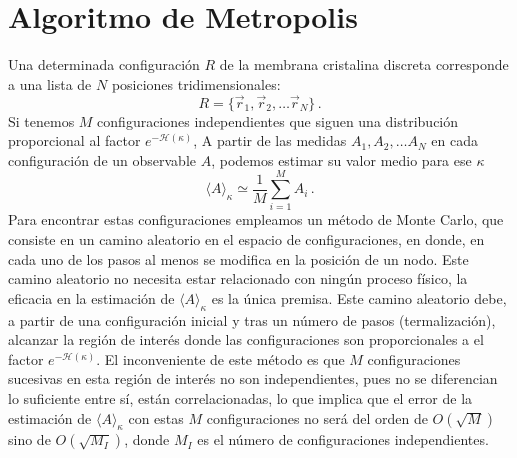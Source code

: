\section{Algoritmo de Metropolis}
Una determinada configuración $R$ de la membrana cristalina discreta 
corresponde a una lista de $N$ posiciones tridimensionales:
\begin{equation}
R=\{ \vec{r}_1,\vec{r}_2,\dots \vec{r}_N\}\,.
\end{equation}
Si tenemos $M$ configuraciones independientes que siguen una distribución
proporcional al factor $e^{-\mathcal{H}(\kappa)}$, A partir de las medidas
$A_1,A_2,\dots A_N$ en cada configuración de un observable $A$, podemos
estimar su valor medio para ese $\kappa$
\begin{equation}
\langle A \rangle_{\kappa}\simeq \frac{1}{M}\sum^M_{i=1} A_i\,.
\end{equation}
Para encontrar estas configuraciones empleamos un método de Monte Carlo, que
consiste en un camino aleatorio en el espacio de configuraciones, en donde, en
cada uno de los pasos al menos se modifica en la posición de un nodo. Este camino
aleatorio no necesita estar relacionado con ningún proceso físico, la eficacia
en la estimación de $\langle A \rangle_{\kappa}$ es la única premisa. Este
camino aleatorio debe, a partir de una configuración inicial y tras un número
de pasos (termalización), alcanzar la región de interés donde
las configuraciones son proporcionales a el factor $
e^{-\mathcal{H}(\kappa)}$. El inconveniente de este método es que $M$
configuraciones sucesivas en esta región de interés no son independientes, pues no se
diferencian lo suficiente entre sí, están correlacionadas, lo que implica que el
error de la estimación de $\langle A \rangle_{\kappa}$ con estas $M$
configuraciones no será del orden de $O(\sqrt{M})$ sino de $O(\sqrt{M_I})$,
donde $M_I$ es el número de configuraciones independientes.  

